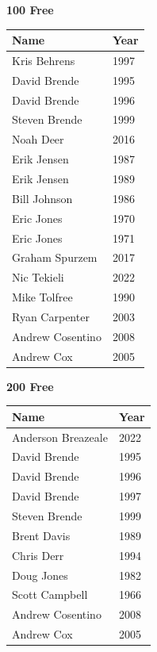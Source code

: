 \begin{minipage}[t]{0.48\textwidth}
\centering
\textbf{\textcolor{teamprimary}{100 Free}}\par
\vspace{0.5em}
\centering
\small
\renewcommand{\arraystretch}{1.0}
\setlength{\tabcolsep}{4pt}
\begin{tabular}{@{}p{3.0cm}p{1.0cm}@{}}
\toprule
\textbf{Name} & \textbf{Year} \\
\midrule
Kris Behrens & 1997 \\
David Brende & 1995 \\
David Brende & 1996 \\
Steven Brende & 1999 \\
Noah Deer & 2016 \\
Erik Jensen & 1987 \\
Erik Jensen & 1989 \\
Bill Johnson & 1986 \\
Eric Jones & 1970 \\
Eric Jones & 1971 \\
Graham Spurzem & 2017 \\
Nic Tekieli & 2022 \\
Mike Tolfree & 1990 \\
Ryan Carpenter & 2003 \\
Andrew Cosentino & 2008 \\
Andrew Cox & 2005 \\
\bottomrule
\end{tabular}
\end{minipage}
\vspace{0.3em}
\vspace{1.2em}
\noindent\begin{minipage}[t]{0.48\textwidth}
\centering
\textbf{\textcolor{teamprimary}{200 Free}}\par
\vspace{0.5em}
\centering
\small
\renewcommand{\arraystretch}{1.0}
\setlength{\tabcolsep}{4pt}
\begin{tabular}{@{}p{3.0cm}p{1.0cm}@{}}
\toprule
\textbf{Name} & \textbf{Year} \\
\midrule
Anderson Breazeale & 2022 \\
David Brende & 1995 \\
David Brende & 1996 \\
David Brende & 1997 \\
Steven Brende & 1999 \\
Brent Davis & 1989 \\
Chris Derr & 1994 \\
Doug Jones & 1982 \\
Scott Campbell & 1966 \\
Andrew Cosentino & 2008 \\
Andrew Cox & 2005 \\
\bottomrule
\end{tabular}
\end{minipage}
